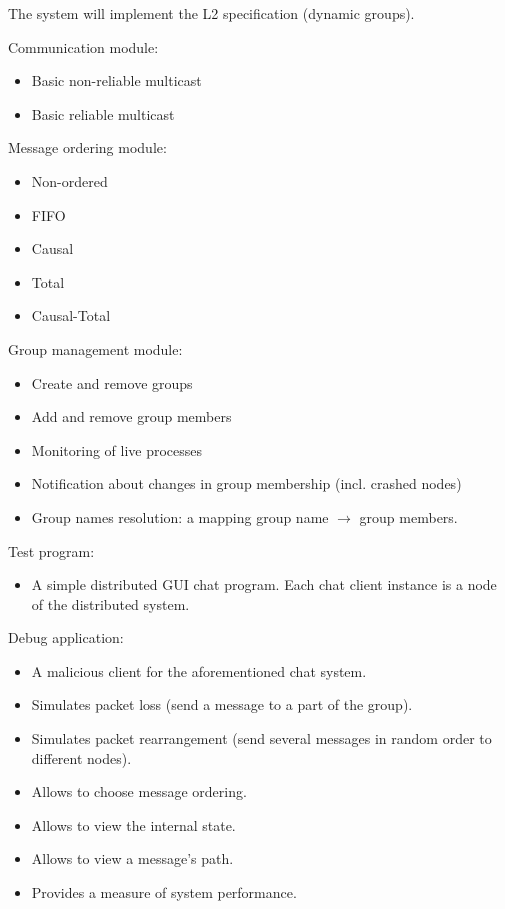 \documentclass[10pt, oneside]{article}
\begin{document}
The system will implement the L2 specification (dynamic groups).

Communication module:
\begin{itemize}
\item Basic non-reliable multicast
\item Basic reliable multicast
\end{itemize}

Message ordering module:
\begin{itemize}
\item Non-ordered
\item FIFO
\item Causal
\item Total
\item Causal-Total
\end{itemize}

Group management module:
\begin{itemize}
\item Create and remove groups
\item Add and remove group members
\item Monitoring of live processes
\item Notification about changes in group membership (incl. crashed nodes)
\item Group names resolution: a mapping group name $\rightarrow$ group members.
\end{itemize}

Test program:
\begin{itemize}
\item A simple distributed GUI chat program. Each chat client instance is a node
  of the distributed system.
\end{itemize}

Debug application:
\begin{itemize}
\item A malicious client for the aforementioned chat system.
\item Simulates packet loss (send a message to a part of the group).
\item Simulates packet rearrangement (send several messages in random order to
  different nodes).
\item Allows to choose message ordering.
\item Allows to view the internal state.
\item Allows to view a message's path.
\item Provides a measure of system performance.
\end{itemize}
\end{document}
